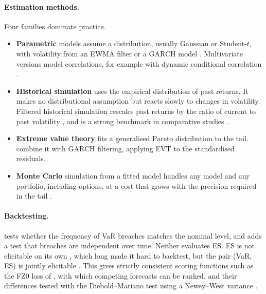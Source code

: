 \paragraph{Estimation methods.} Four families dominate practice.
\begin{itemize}
  \item \textbf{Parametric} models assume a distribution, usually Gaussian or Student-$t$, with volatility from an
    EWMA filter \citep{riskmetrics1996} or a GARCH model \citep{bollerslev1986}. Multivariate versions model
    correlations, for example with dynamic conditional correlation \citep{engle2002}.
  \item \textbf{Historical simulation} uses the empirical distribution of past returns. It makes no distributional
    assumption but reacts slowly to changes in volatility. Filtered historical simulation rescales past returns by
    the ratio of current to past volatility \citep{barone1999}, and is a strong benchmark in comparative studies
    .
  \item \textbf{Extreme value theory} fits a generalised Pareto distribution to the tail. 
    combine it with GARCH filtering, applying EVT to the standardised residuals.
  \item \textbf{Monte Carlo} simulation from a fitted model handles any model and any portfolio, including
    options, at a cost that grows with the precision required in the tail \citep{glasserman2003}.
\end{itemize}

\paragraph{Backtesting.}  tests whether the frequency of VaR breaches matches the nominal
level, and \citet{christoffersen1998} adds a test that breaches are independent over time. Neither evaluates ES.
ES is not elicitable on its own \citep{gneiting2011}, which long made it hard to backtest, but the pair (VaR, ES)
is jointly elicitable \citep{fissler2016}. This gives strictly consistent scoring functions such as the FZ0 loss
of \citet{patton2019}, with which competing forecasts can be ranked, and their differences tested with the
Diebold--Mariano test \citep{diebold1995} using a Newey--West variance \citep{newey1987}.

